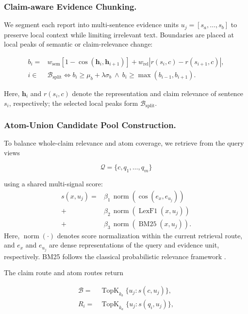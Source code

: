 \documentclass[letterpaper]{article}
\begin{document}
\subsubsection{Claim-aware Evidence Chunking.}

We segment each report into multi-sentence evidence units
$u_j=[s_a,\ldots,s_b]$ to preserve local context while limiting
irrelevant text. Boundaries are placed at local peaks of semantic or
claim-relevance change:

\[
\begin{aligned}
    b_i={}&w_{\mathrm{sem}}
    \left[1-\cos(\mathbf h_i,\mathbf h_{i+1})\right]
    +w_{\mathrm{rel}}
    \left|r(s_i,c)-r(s_{i+1},c)\right|,\\
    i\in&\mathcal B_{\mathrm{split}}
    \iff{} b_i\ge \mu_b+\lambda\sigma_b
    \ \land\
    b_i\ge\max(b_{i-1},b_{i+1}).
\end{aligned}
\]

Here, $\mathbf h_i$ and $r(s_i,c)$ denote the representation and
claim relevance of sentence $s_i$, respectively; the selected local
peaks form $\mathcal B_{\mathrm{split}}$.

\subsubsection{Atom-Union Candidate Pool Construction.}

To balance whole-claim relevance and atom coverage, we retrieve from
the query views

\[
\mathcal Q=\{c,q_1,\ldots,q_m\}
\]

using a shared multi-signal score:
\[
\begin{aligned}
s(x,u_j)
={}&\beta_1\,\operatorname{norm}\!\left(\cos(e_x,e_{u_j})\right)\\
+&\beta_2\,\operatorname{norm}\!\left(\operatorname{LexF1}(x,u_j)\right)\\
+&\beta_3\,\operatorname{norm}\!\left(\operatorname{BM25}(x,u_j)\right).
\end{aligned}
\]
Here, $\operatorname{norm}(\cdot)$ denotes score normalization within the current retrieval route, and $e_x$ and $e_{u_j}$ are dense representations of the query and evidence unit, respectively. BM25 follows the classical probabilistic relevance framework \citep{Robertson2009BM25}.

The claim route and atom routes return

\[
\begin{aligned}
\mathcal B =& \operatorname{TopK}_{k_b}\{u_j:s(c,u_j)\},\\
R_i =& \operatorname{TopK}_{k_a}\{u_j:s(q_i,u_j)\},
\end{aligned}
\]
\end{document}
